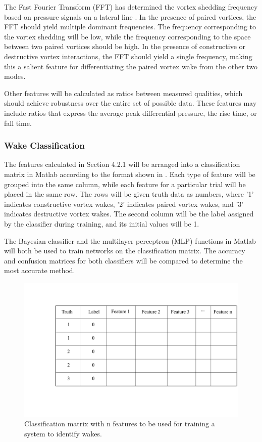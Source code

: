     The Fast Fourier Transform (FFT) has determined the vortex shedding frequency based on pressure signals on a lateral line \citep{Venturelli2012}. In the presence of paired vortices, the FFT should yield multiple dominant frequencies. The frequency corresponding to the vortex shedding will be low, while the frequency corresponding to the space between two paired vortices should be high. In the presence of constructive or destructive vortex interactions, the FFT should yield a single frequency, making this a salient feature for differentiating the paired vortex wake from the other two modes.
    
    Other features will be calculated as ratios between measured qualities, which should achieve robustness over the entire set of possible data. These features may include ratios that express the average peak differential pressure, the rise time, or fall time.
    
\subsubsection{Wake Classification}

    The features calculated in Section 4.2.1 will be arranged into a classification matrix in Matlab according to the format shown in . Each type of feature will be grouped into the same column, while each feature for a particular trial will be placed in the same row. The rows will be given truth data as numbers, where '1' indicates constructive vortex wakes, '2' indicates paired vortex wakes, and '3' indicates destructive vortex wakes. The second column will be the label assigned by the classifier during training, and its initial values will be 1. 
    
    The Bayesian classifier and the multilayer perceptron (MLP) functions in Matlab will both be used to train networks on the classification matrix. The accuracy and confusion matrices for both classifiers will be compared to determine the most accurate method.

\begin{figure}
\begin{center}
\includegraphics[width=0.75\columnwidth]{figures/Classification Matrix.png}
\end{center}
\caption{Classification matrix with n features to be used for training a system to identify wakes.}
\label{fig:methods:Class Matrix}
\end{figure}

